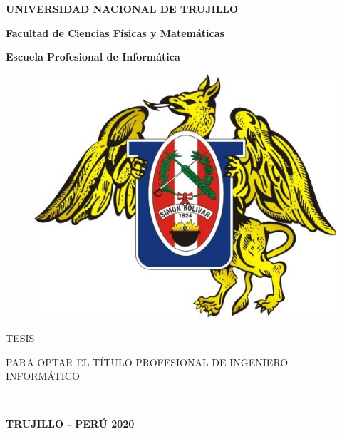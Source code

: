 \textheight 19cm
\pagestyle{empty}
\begin{center}
 {\bf {\fontsize{14}{16.8}\selectfont UNIVERSIDAD NACIONAL DE TRUJILLO}}     
 
    {\bf{\fontsize{14}{16.8}\selectfont Facultad de Ciencias Físicas y Matemáticas}} 

  {\bf{\fontsize{14}{16.8}\selectfont Escuela Profesional de Informática}}
\end{center}  

\begin{figure}[ht]
\begin{center}
\includegraphics[width=.4\textwidth]{unt}
\end{center}
\end{figure}
\vskip 0.5cm

\begin{center}
  {\bf\Large{{\fontsize{17}{20.4}\selectfont{Sistema Basado en Conocimiento Mediante RNA para Pronósticar las Ventas en el Mall Aventura} }}}     
\end{center}
\vskip 0.5cm

\begin{center}
{\Large{TESIS}}
\end{center}
\begin{center}
{\large{\hspace*{0.4cm} PARA OPTAR EL TÍTULO PROFESIONAL DE INGENIERO  INFORMÁTICO}}
\end{center}

\vskip 0.6cm
\begin{center}
  { \fontsize{14}{16.8}} \\
    \vskip 0.2cm
    { \fontsize{14}{16.8}}

     
\end{center}   


\vskip 1.1cm
\begin{center}    
{\bf {\fontsize{14}{16.8}\selectfont TRUJILLO - PERÚ
\vskip 0.0cm
\hspace*{-0.2cm} 
2020 }}
\end{center} 
\newpage


